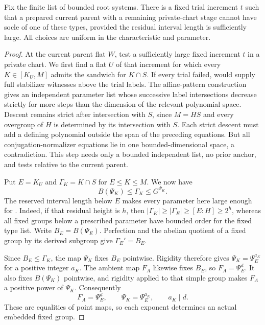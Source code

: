 \begin{proposition}\label{w:bounded-exclusion}
Fix the finite list of bounded root systems. There is a fixed trial increment $t$ such that a prepared current parent with a remaining private-chart stage cannot have socle of one of these types, provided the residual interval length is sufficiently large. All choices are uniform in the characteristic and parameter.
\end{proposition}
\begin{proof}
At the current parent flat $W$, test a sufficiently large fixed
increment $t$ in a private chart. We first find a flat $U$ of that
increment for which every $K\in[K_U,M]$ admits the sandwich for
$K\cap S$. If every trial failed,  would supply full
stabilizer witnesses above the trial labels. The affine-pattern
construction gives an independent parameter list whose successive
label intersections decrease strictly for more steps than the dimension
of the relevant polynomial space. Descent remains strict after
intersection with $S$, since $M=HS$ and every overgroup of $H$ is
determined by its intersection with $S$. Each strict descent must add
a defining polynomial outside the span of the preceding equations.
But all conjugation-normalizer equations lie in one bounded-dimensional
space, a contradiction. This step needs only a bounded independent
list, no prior anchor, and tests relative to the current parent.

Put $E=K_U$ and $\Gamma_K=K\cap S$ for $E\le K\le M$. We now have
\[
 B(\Psi_K)\le\Gamma_K\le G^{\Psi_K}.
\]
The reserved interval length below $E$ makes every parameter here
large enough for . Indeed, if that residual
height is $h$, then
$|\Gamma_K|\ge|\Gamma_E|\ge[E:H]\ge2^h$, whereas all fixed groups
below a prescribed parameter have bounded order for the fixed type
list. Write $B_E=B(\Psi_E)$. Perfection and the abelian quotient of a
fixed group by its derived subgroup give $\Gamma_E'=B_E$.

Since $B_E\le\Gamma_K$, the map $\Psi_K$ fixes $B_E$ pointwise.
Rigidity therefore gives $\Psi_K=\Psi_E^{a_K}$ for a positive integer
$a_K$. The ambient map $F_A$ likewise fixes $B_E$, so $F_A=\Psi_E^d$.
It also fixes $B(\Psi_K)$ pointwise, and rigidity applied to that
simple group makes $F_A$ a positive power of $\Psi_K$. Consequently
\[
 F_A=\Psi_E^d,\qquad \Psi_K=\Psi_E^{a_K},\qquad a_K\mid d.
\]
These are equalities of point maps, so each exponent determines an
actual embedded fixed group.


\end{proof}
